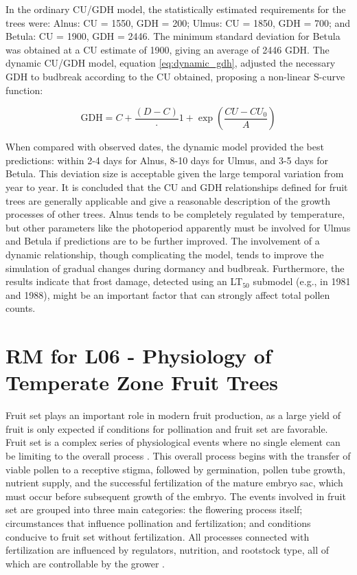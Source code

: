 \vspace{0.5em}
In the ordinary CU/GDH model, the statistically estimated requirements for the trees were: Alnus: CU = 1550, GDH = 200; Ulmus: CU = 1850, GDH = 700; and Betula: CU = 1900, GDH = 2446. The minimum standard deviation for Betula was obtained at a CU estimate of 1900, giving an average of 2446 GDH.
The dynamic CU/GDH model, equation \ref{eq:dynamic_gdh}, adjusted the necessary GDH to budbreak according to the CU obtained, proposing a non-linear S-curve function: 

\begin{equation}
    \text{GDH} = C + \dfrac{(D - C)} \cdot {1 + \exp\left(\dfrac{CU - CU_0}{A}\right)}
    \label{eq:dynamic_gdh}
\end{equation}

\vspace{0.5em}
When compared with observed dates, the dynamic model provided the best predictions: within 2-4 days for Alnus, 8-10 days for Ulmus, and 3-5 days for Betula. This deviation size is acceptable given the large temporal variation from year to year.
It is concluded that the CU and GDH relationships defined for fruit trees are generally applicable and give a reasonable description of the growth processes of other trees. Alnus tends to be completely regulated by temperature, but other parameters like the photoperiod apparently must be involved for Ulmus and Betula if predictions are to be further improved. The involvement of a dynamic relationship, though complicating the model, tends to improve the simulation of gradual changes during dormancy and budbreak. Furthermore, the results indicate that frost damage, detected using an LT$_{50}$ submodel (e.g., in 1981 and 1988), might be an important factor that can strongly affect total pollen counts.


\section{RM for L06 - Physiology of Temperate Zone Fruit Trees}

Fruit set plays an important role in modern fruit production, as a large yield of fruit is only expected if conditions for pollination and fruit set are favorable. Fruit set is a complex series of physiological events where no single element can be limiting to the overall process \cite*{rmb_01_physiology_temperate_zone_fruit_trees}. This overall process begins with the transfer of viable pollen to a receptive stigma, followed by germination, pollen tube growth, nutrient supply, and the successful fertilization of the mature embryo sac, which must occur before subsequent growth of the embryo. The events involved in fruit set are grouped into three main categories: the flowering process itself; circumstances that influence pollination and fertilization; and conditions conducive to fruit set without fertilization. All processes connected with fertilization are influenced by regulators, nutrition, and rootstock type, all of which are controllable by the grower \cite*{rmb_01_physiology_temperate_zone_fruit_trees}.

